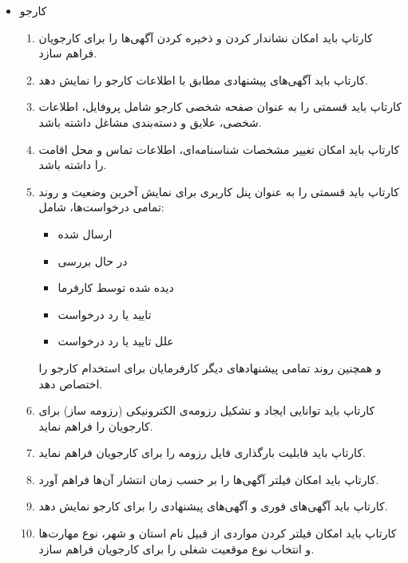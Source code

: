 \documentclass{report}
\begin{document}
				\begin{itemize}
					\item کارجو
						\begin{enumerate}
							\item 
							کارتاپ باید امکان نشاندار کردن و ذخیره کردن آگهی‌ها را برای کارجویان فراهم سازد.
							
							\item 
							کارتاپ باید آگهی‌های پیشنهادی مطابق با اطلاعات کارجو را نمایش دهد.
							
							\item 
							کارتاپ باید قسمتی را به عنوان صفحه شخصی کارجو شامل پروفایل، اطلاعات شخصی، علایق و دسته‌بندی مشاغل داشته باشد.
							
							\item 
							کارتاپ باید امکان تغییر مشخصات شناسنامه‌ای، اطلاعات تماس و محل اقامت را داشته باشد.
							\item 
							کارتاپ باید قسمتی را به عنوان پنل کاربری برای نمایش آخرین وضعیت و روند تمامی درخواست‌ها، شامل:
							\begin{itemize}
								\item ارسال شده
								\item در حال بررسی
								\item دیده شده توسط کارفرما
								\item تایید یا رد درخواست
								\item علل تایید یا رد درخواست
							\end{itemize}
							
							و همچنین روند تمامی پیشنهادهای دیگر کارفرمایان برای استخدام کارجو را اختصاص دهد.
							
							\item 
							کارتاپ باید توانایی ایجاد و تشکیل رزومه‌ی الکترونیکی (رزومه ساز) برای کارجویان را فراهم نماید.
							
							\item 
							کارتاپ باید قابلیت بارگذاری فایل رزومه را برای کارجویان فراهم نماید.
							\item 
							کارتاپ باید امکان فیلتر آگهی‌ها را بر حسب زمان انتشار آن‌ها فراهم آورد.
							\item 
							کارتاپ باید آگهی‌های فوری و آگهی‌های پیشنهادی را برای کارجو نمایش دهد.
							
							\item 
							کارتاپ باید امکان فیلتر کردن مواردی از قبیل نام استان و شهر، نوع مهارت‌ها و انتخاب نوع موقعیت شغلی را برای کارجویان فراهم سازد.
							

\end{enumerate}
\end{itemize}
\end{document}
